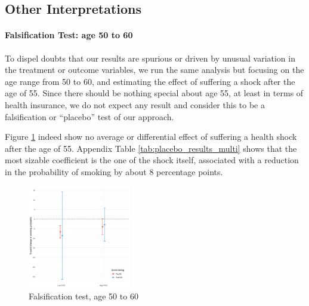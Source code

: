 \documentclass[11pt]{article}
\begin{document}
\subsection{Other Interpretations}\label{sec:interpret}

\paragraph{Falsification Test: age 50 to 60}
To dispel doubts that our results are spurious or driven by unusual variation in the treatment or outcome variables, we run the same analysis but focusing on the age range from 50 to 60, and estimating the effect of suffering a shock after the age of 55.
Since there should be nothing special about age 55, at least in terms of health insurance, we do not expect any result and consider this to be a falsification or ``placebo'' test of our approach. 

Figure \ref{fig:placebo} indeed show no average or differential effect of suffering a health shock after the age of 55.
Appendix Table \ref{tab:placebo_results_multi} shows that the most sizable coefficient is the one of the shock itself, associated with a reduction in the probability of smoking by about 8 percentage points.

\begin{figure}[!ht]
	\begin{center}
		\includegraphics[width=0.4\textwidth]{../3_output/shock_effects/placebo_5060_100_cv.png}
		\caption{Falsification test, age 50 to 60
		\label{fig:placebo}
		}
	\vspace{-0.8cm}
	\end{center}
\end{figure}
\end{document}
